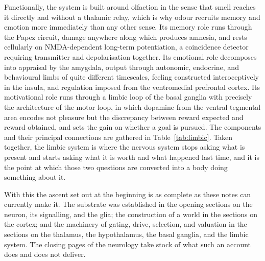 \documentclass[11pt]{article}
\begin{document}
Functionally, the system is built around olfaction in the sense that smell reaches it directly and without a thalamic relay, which is why odour recruits memory and emotion more immediately than any other sense. Its memory role runs through the Papez circuit, damage anywhere along which produces amnesia, and rests cellularly on NMDA-dependent long-term potentiation, a coincidence detector requiring transmitter and depolarisation together. Its emotional role decomposes into appraisal by the amygdala, output through autonomic, endocrine, and behavioural limbs of quite different timescales, feeling constructed interoceptively in the insula, and regulation imposed from the ventromedial prefrontal cortex. Its motivational role runs through a limbic loop of the basal ganglia with precisely the architecture of the motor loop, in which dopamine from the ventral tegmental area encodes not pleasure but the discrepancy between reward expected and reward obtained, and sets the gain on whether a goal is pursued. The components and their principal connections are gathered in Table~\ref{tab:limbic}. Taken together, the limbic system is where the nervous system stops asking what is present and starts asking what it is worth and what happened last time, and it is the point at which those two questions are converted into a body doing something about it.

With this the ascent set out at the beginning is as complete as these notes can currently make it. The substrate was established in the opening sections on the neuron, its signalling, and the glia; the construction of a world in the sections on the cortex; and the machinery of gating, drive, selection, and valuation in the sections on the thalamus, the hypothalamus, the basal ganglia, and the limbic system. The closing pages of the neurology take stock of what such an account does and does not deliver.
\end{document}
